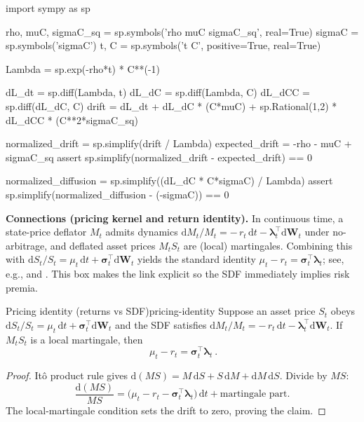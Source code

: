 ﻿\documentclass[11pt,letterpaper,oneside]{article}
\numberwithin{equation}{section}
\newcommand{\1}{\mathbf{1}}
\newcommand{\diff}{\mathrm{d}}
\begin{document}
\begin{sympycheck}[title={Verification: SDF dynamics via It\^o's Lemma}]
\begin{pyconsole}
import sympy as sp

rho, muC, sigmaC_sq = sp.symbols('rho muC sigmaC_sq', real=True)
sigmaC = sp.symbols('sigmaC')
t, C = sp.symbols('t C', positive=True, real=True)

Lambda = sp.exp(-rho*t) * C**(-1)

dL_dt = sp.diff(Lambda, t)
dL_dC = sp.diff(Lambda, C)
dL_dCC = sp.diff(dL_dC, C)
drift = dL_dt + dL_dC * (C*muC) + sp.Rational(1,2) * dL_dCC * (C**2*sigmaC_sq)

normalized_drift = sp.simplify(drift / Lambda)
expected_drift = -rho - muC + sigmaC_sq
assert sp.simplify(normalized_drift - expected_drift) == 0

normalized_diffusion = sp.simplify((dL_dC * C*sigmaC) / Lambda)
assert sp.simplify(normalized_diffusion - (-sigmaC)) == 0
\end{pyconsole}
\end{sympycheck}

\begin{tcolorbox}[literaturestyle]
	\textbf{Connections (pricing kernel and return identity).} In continuous time, a state-price deflator $M_t$ admits dynamics $\diff M_t/M_t=-\,r_t\,\diff t-\bm{\lambda}_t^{\top}\diff\bm{W}_t$ under no-arbitrage, and deflated asset prices $M_t S_t$ are (local) martingales. Combining this with $\diff S_t/S_t=\mu_t\,\diff t+\bm{\sigma}_t^{\top}\diff\bm{W}_t$ yields the standard identity $\mu_t-r_t=\bm{\sigma}_t^{\top}\bm{\lambda}_t$; see, e.g., \cite[Eq.~(A.21)]{bjork2009} and \cite{cochrane2005}. This box makes the link explicit so the SDF immediately implies risk premia.
\end{tcolorbox}

\begin{proposition}{Pricing identity (returns vs SDF)}{pricing-identity}
Suppose an asset price $S_t$ obeys $\diff S_t/S_t=\mu_t\,\diff t+\bm{\sigma}_t^{\top}\diff\bm{W}_t$ and the SDF satisfies $\diff M_t/M_t=-\,r_t\,\diff t-\bm{\lambda}_t^{\top}\diff\bm{W}_t$. If $M_tS_t$ is a local martingale, then
\[
\boxed{\ \mu_t - r_t = \bm{\sigma}_t^{\top}\bm{\lambda}_t\ }.
\]
\end{proposition}
\begin{proof}
It\^o product rule gives $\diff(MS)=M\,\diff S+S\,\diff M+\diff M\,\diff S$. Divide by $MS$:
\[
\frac{\diff(MS)}{MS}=\Big(\mu_t-r_t-\bm{\sigma}_t^{\top}\bm{\lambda}_t\Big)\,\diff t+\text{martingale part}.
\]
The local-martingale condition sets the drift to zero, proving the claim.
\end{proof}
\end{document}
